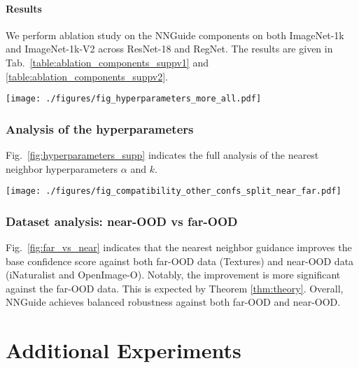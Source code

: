 \documentclass[10pt,twocolumn,letterpaper]{article}
\begin{document}
\paragraph{Results}
We perform ablation study on the NNGuide components on both ImageNet-1k and ImageNet-1k-V2 across ResNet-18 and RegNet. The results are given in Tab.~\ref{table:ablation_components_suppv1} and \ref{table:ablation_components_suppv2}.


\begin{figure*}[t]
\centering
\texttt{[image: ./figures/fig\_hyperparameters\_more\_all.pdf]}
\caption{
The performance of NNGuide across the number $k$ of nearest neighbors and the sampling ratio $\alpha$.
}
\label{fig:hyperparameters_supp}
\end{figure*}

\subsubsection{Analysis of the hyperparameters}
Fig.~\ref{fig:hyperparameters_supp} indicates the full analysis of the nearest neighbor hyperparameters $\alpha$ and $k$.

\begin{figure*}[t]
\centering
\texttt{[image: ./figures/fig\_compatibility\_other\_confs\_split\_near\_far.pdf]}
\caption{
The improvement by our proposed nearest neighbor guidance against far-OOD data (Textures) and near-OOD data (iNaturalist and OpenImage-O). The ID data is ImageNet-1k and the model is ResNet-50.
}
\label{fig:far_vs_near}
\end{figure*}

\subsubsection{Dataset analysis: near-OOD vs far-OOD}
Fig.~\ref{fig:far_vs_near} indicates that the nearest neighbor guidance improves the base confidence score against both far-OOD data (\ie Textures) and near-OOD data (\ie iNaturalist and OpenImage-O). Notably, the improvement is more significant against the far-OOD data. This is expected by Theorem \ref{thm:theory}. Overall, NNGuide achieves balanced robustness against both far-OOD and near-OOD. 

\section{Additional Experiments}
\end{document}

